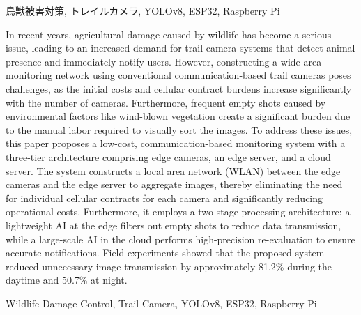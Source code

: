 \documentclass[technicalreport]{ieicej}
\begin{document}
\begin{abstract}
    近年，野生鳥獣による農作物被害が深刻化している．その対策として，動物の出現を検知し，撮影画像を即時に通知するトレイルカメラシステムの需要が高まっている．
    しかし，従来の通信型トレイルカメラによる監視網の構築は，カメラ台数に応じて導入コストや通信回線契約の負担が増加する．
    さらに，風による草木の揺れ等に起因する空撮影が大量に発生するため，画像を目視選別する人的コストも大きな課題である．
    本論文では，これらの課題に対し，エッジカメラ，エッジサーバ，クラウドサーバの3層から構成される低コスト通信型警戒システムを提案する．
    提案システムでは，エッジカメラとエッジサーバ間にローカルネットワーク（WLAN）を構築して画像を集約する．これにより，カメラ個別の通信契約を不要とし，運用コストを削減する．
    さらに，エッジ側の軽量AIを用いた一次選別で空撮影画像を破棄して通信量を抑制し，クラウド側の大規模AIによる再判定で高精度な通知を実現する．
    実験の結果，一次選別により昼間では約81.2\%，夜間では約50.7\%の画像削減率を確認した．
\end{abstract}
\begin{keyword}
    鳥獣被害対策, トレイルカメラ, YOLOv8, ESP32, Raspberry Pi
\end{keyword}
\begin{eabstract}
    In recent years, agricultural damage caused by wildlife has become a serious issue, leading to an increased demand for trail camera systems that detect animal presence and immediately notify users.
    However, constructing a wide-area monitoring network using conventional communication-based trail cameras poses challenges, as the initial costs and cellular contract burdens increase significantly with the number of cameras.
    Furthermore, frequent empty shots caused by environmental factors like wind-blown vegetation create a significant burden due to the manual labor required to visually sort the images.
    To address these issues, this paper proposes a low-cost, communication-based monitoring system with a three-tier architecture comprising edge cameras, an edge server, and a cloud server.
    The system constructs a local area network (WLAN) between the edge cameras and the edge server to aggregate images, thereby eliminating the need for individual cellular contracts for each camera and significantly reducing operational costs.
    Furthermore, it employs a two-stage processing architecture: a lightweight AI at the edge filters out empty shots to reduce data transmission, while a large-scale AI in the cloud performs high-precision re-evaluation to ensure accurate notifications.
    Field experiments showed that the proposed system reduced unnecessary image transmission by approximately 81.2\% during the daytime and 50.7\% at night.
\end{eabstract}
\begin{ekeyword}
    Wildlife Damage Control, Trail Camera, YOLOv8, ESP32, Raspberry Pi
\end{ekeyword}
\maketitle
\end{document}
